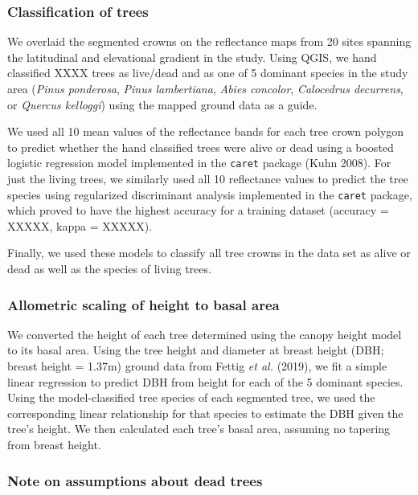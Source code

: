 \documentclass[]{article}
\begin{document}
\subsubsection{Classification of trees}\label{classification-of-trees}

We overlaid the segmented crowns on the reflectance maps from 20 sites
spanning the latitudinal and elevational gradient in the study. Using
QGIS, we hand classified XXXX trees as live/dead and as one of 5
dominant species in the study area (\emph{Pinus ponderosa}, \emph{Pinus
lambertiana}, \emph{Abies concolor}, \emph{Calocedrus decurrens}, or
\emph{Quercus kelloggi}) using the mapped ground data as a guide.

We used all 10 mean values of the reflectance bands for each tree crown
polygon to predict whether the hand classified trees were alive or dead
using a boosted logistic regression model implemented in the
\texttt{caret} package (Kuhn 2008). For just the living trees, we
similarly used all 10 reflectance values to predict the tree species
using regularized discriminant analysis implemented in the
\texttt{caret} package, which proved to have the highest accuracy for a
training dataset (accuracy = XXXXX, kappa = XXXXX).

Finally, we used these models to classify all tree crowns in the data
set as alive or dead as well as the species of living trees.

\subsubsection{Allometric scaling of height to basal
area}\label{allometric-scaling-of-height-to-basal-area}

We converted the height of each tree determined using the canopy height
model to its basal area. Using the tree height and diameter at breast
height (DBH; breast height = 1.37m) ground data from Fettig \emph{et
al.} (2019), we fit a simple linear regression to predict DBH from
height for each of the 5 dominant species. Using the model-classified
tree species of each segmented tree, we used the corresponding linear
relationship for that species to estimate the DBH given the tree's
height. We then calculated each tree's basal area, assuming no tapering
from breast height.

\subsubsection{Note on assumptions about dead
trees}\label{note-on-assumptions-about-dead-trees}
\end{document}
